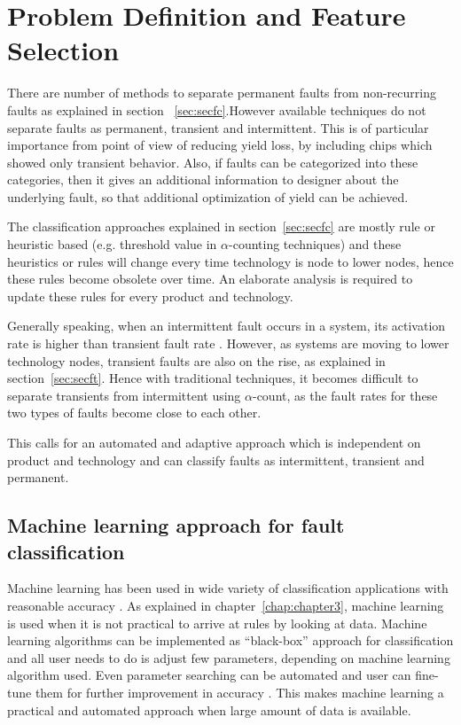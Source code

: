 \chapter{Problem Definition and Feature Selection}
\label{chap:chapter4}
There are number of methods to separate permanent faults from non-recurring faults as explained in section ~\ref{sec:secfc}.However available techniques do not separate faults as permanent, transient and intermittent. This is of particular importance from point of view of reducing yield loss, by including chips which showed only transient behavior. Also, if faults can be categorized into these categories, then it gives an additional information to designer about the underlying fault, so that additional optimization of yield can be achieved. 

The classification approaches explained in section~\ref{sec:secfc} are mostly rule or heuristic based (e.g. threshold value in $\alpha$-counting techniques) and these heuristics or rules will change every time technology is node to lower nodes, hence these rules become obsolete over time. An elaborate analysis is required to update these rules for every product and technology.

Generally speaking, when an intermittent fault occurs in a system, its activation rate is higher than transient fault rate \cite{Bondavalli2000}. However, as systems are moving to lower technology nodes, transient faults are also on the rise, as explained in section~\ref{sec:secft}. Hence with traditional techniques, it becomes difficult to separate transients from intermittent using $\alpha$-count, as the fault rates for these two types of faults become close to each other.

This calls for an automated and adaptive approach which is independent on product and technology and can classify faults as intermittent, transient and permanent. 

\section{Machine learning approach for fault classification}

Machine learning has been used in wide variety of classification applications with reasonable accuracy \cite{Pang2002,Nguyen2008,Sebastiani2002, Kotsiantis2007}. As explained in chapter~\ref{chap:chapter3}, machine learning is used when it is not practical to arrive at rules by looking at data. Machine learning algorithms can be implemented as \enquote{black-box} approach for classification and all user needs to do is adjust few parameters, depending on machine learning algorithm used. Even parameter searching can be automated and user can fine-tune them for further improvement in accuracy \cite{Hsu2003, Castillo2000}. This makes machine learning a practical and automated approach when large amount of data is available.

